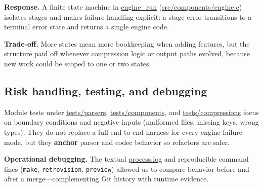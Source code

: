 \textbf{Response.} A finite state machine in \url{engine_run} (\url{src/components/engine.c}) isolates stages and makes failure handling explicit: a stage error transitions to a terminal error state and returns a single engine code.

\textbf{Trade-off.} More states mean more bookkeeping when adding features, but the structure paid off whenever compression logic or output paths evolved, because new work could be scoped to one or two states.

\subsection{Risk handling, testing, and debugging}
Module tests under \url{tests/parsers}, \url{tests/components}, and \url{tests/compressions} focus on boundary conditions and negative inputs (malformed files, missing keys, wrong types). They do not replace a full end-to-end harness for every engine failure mode, but they \textbf{anchor} parser and codec behavior so refactors are safer.

\textbf{Operational debugging.} The textual \url{process.log} and reproducible command lines (\texttt{make}, \texttt{retrovision}, \texttt{preview}) allowed us to compare behavior before and after a merge—complementing Git history with runtime evidence.
